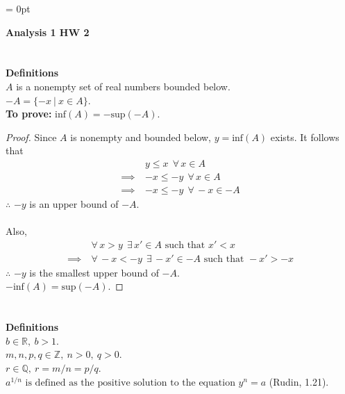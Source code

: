 \documentclass[12pt]{article}
\begin{document}

\setcounter{section}{4} %
\renewcommand{\thesection}{\arabic{section}}


\parindent = 0pt


      {\bf Analysis 1 HW 2}



\section{}

 {\bf Definitions}\\
$A$ is a nonempty set of real numbers bounded below. \\
$-A = \{-x \ |\  x \in A\}$. \\

{\bf To prove:}
$\text{inf}(A) = -\text{sup}(-A)$.

\begin{proof}
      Since $A$ is nonempty and bounded below, $y = \text{inf}(A)$ exists. It follows that
      \begin{align*}
                        & y \le x \ \ \forall \, x \in A     \\
            \implies \  & -x \le -y \ \ \forall \, x \in A   \\
            \implies \  & -x \le -y \ \ \forall \, -x \in -A
      \end{align*}
      $\therefore$ $-y$ is an upper bound of $-A$.\\ \\
      Also,
      \begin{align*}
                        & \forall \, x > y \ \ \exists \,x' \in A \text{ such that } x' < x       \\
            \implies \  & \forall \, -x < -y \ \ \exists \,-x' \in -A \text{ such that } -x' > -x
      \end{align*}
      $\therefore$ $-y$ is the smallest upper bound of $-A$.\\
      $-\text{inf}(A) = \text{sup}(-A)$.
\end{proof}

\section{}
 {\bf Definitions}\\
$b \in \mathbb{R}, \  b > 1$.\\
$m, n, p, q \in \mathbb{Z}, \  n>0, \  q>0$.\\
$r \in \mathbb{Q},  \ r = m/n = p/q$.\\
$a^{1/n} \text{ is defined as the positive solution to the equation } y^n = a$ (Rudin, 1.21).
\end{document}
